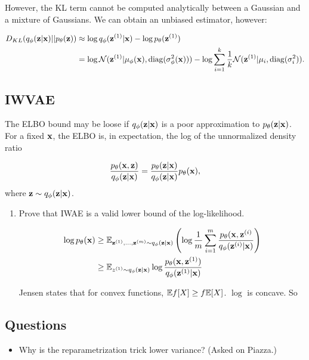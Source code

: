 However, the KL term cannot be computed analytically between a Gaussian and a mixture of Gaussians.  We can obtain an unbiased estimator, however:

\begin{align*}
  D_{KL}(q_{\phi}(\mathbf{z} | \mathbf{x}) || p_{\theta}(\mathbf{z})) & \approx \log q_{\phi} (\mathbf{z}^{(1)} | \mathbf{x}) - \log p_{\theta}(\mathbf{z}^{(1)}) \\
  & = \log \mathcal{N} (\mathbf{z}^{(1)} | \mu_{\phi}(\mathbf{x}), \operatorname{diag}(\sigma_{\phi}^2 (\mathbf{x}))) - \log \sum_{i=1}^{k} \frac{1}{k} \mathcal{N} (\mathbf{z}^{(1)} | \mu_i, \operatorname{diag}(\sigma_i^2)).
\end{align*}


\subsection{IWVAE}

The ELBO bound may be loose if $q_{\phi}(\mathbf{z} | \mathbf{x})$ is a poor approximation to $p_{\theta}(\mathbf{z} | \mathbf{x})$.  For a fixed $\mathbf{x}$, the ELBO is, in expectation, the log of the unnormalized density ratio 


\[
  \frac{p_{\theta}(\mathbf{x}, \mathbf{z})}{q_{\phi}(\mathbf{z} | \mathbf{x})} = \frac{p_{\theta}(\mathbf{z} | \mathbf{x})}{q_{\phi}(\mathbf{z} | \mathbf{x})} p_{\theta}(\mathbf{x}),
\]
where $\mathbf{z} \sim q_{\phi}(\mathbf{z} | \mathbf{x})$.

\begin{enumerate}
  \item Prove that IWAE is a valid lower bound of the log-likelihood.

    \begin{align*}
      \log p_{\theta}(\mathbf{x}) & \geq \mathbb{E}_{\mathbf{z}^{(1)}, \dots, \mathbf{z}^{(m)} \sim q_{\phi}(\mathbf{z} | \mathbf{x})} \left( \log \frac{1}{m} \sum_{i=1}^{m} \frac{p_{\theta}(\mathbf{x}, \mathbf{z}^{(i)}}{q_{\phi}(\mathbf{z}^{(i)} | \mathbf{x})} \right) \\
        & \geq \mathbb{E}_{z^{(1)} \sim q_{\phi}(\mathbf{z} | \mathbf{x})} \log \frac{p_{\theta}(\mathbf{x}, \mathbf{z}^{(1)})}{q_{\phi}(\mathbf{z}^{(1)} |  \mathbf{x})}
    \end{align*}

    Jensen states that for convex functions, $\mathbb{E} f[X] \geq f \mathbb{E}[X]$. $\log$ is concave.  So

\end{enumerate}

\subsection{Questions}


\begin{itemize}
  \item Why is the reparametrization trick lower variance? (Asked on Piazza.)
\end{itemize}


